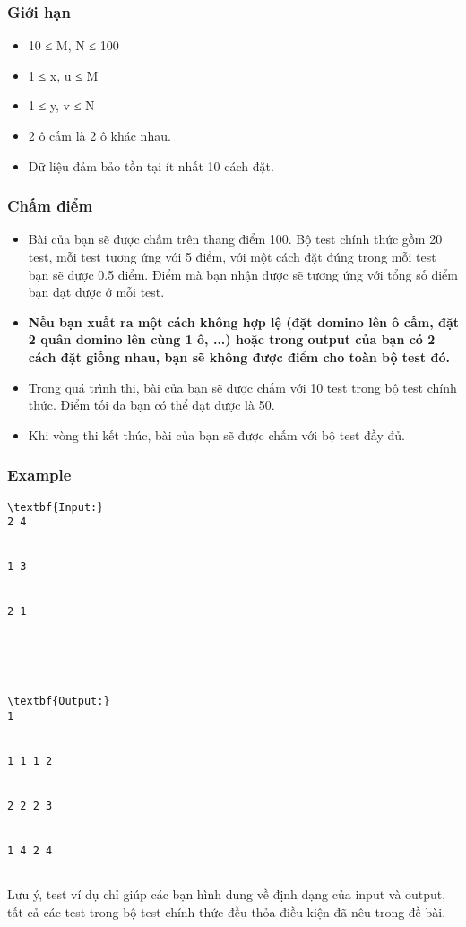 \subsubsection{   Giới hạn  }
\begin{itemize}
	\item     10 ≤ M, N ≤ 100   
	\item     1 ≤ x, u ≤ M   
	\item     1 ≤ y, v ≤ N   
	\item     2 ô cấm là 2 ô khác nhau.   
	\item     Dữ liệu đảm bảo tồn tại ít nhất 10 cách đặt.   
\end{itemize}

\subsubsection{   Chấm điểm  }
\begin{itemize}
	\item     Bài của bạn sẽ được chấm trên thang điểm 100. Bộ test chính thức gồm 20 test, mỗi test tương ứng với 5 điểm, với một cách đặt đúng trong mỗi test bạn sẽ được 0.5 điểm. Điểm mà bạn nhận được sẽ tương ứng với tổng số điểm bạn đạt được ở mỗi test.   
	\item \textbf{     Nếu bạn xuất ra một cách không hợp lệ (đặt domino lên ô cấm, đặt 2  quân domino lên cùng 1 ô, ...) hoặc trong output của bạn có 2 cách đặt  giống nhau, bạn sẽ không được điểm cho toàn bộ test đó.    }
	\item     Trong quá trình thi, bài của bạn sẽ được chấm với 10 test trong bộ test chính thức. Điểm tối đa bạn có thể đạt được là 50.   
	\item     Khi vòng thi kết thúc, bài của bạn sẽ được chấm với bộ test đầy đủ.   
\end{itemize}
\begin{itemize}
\end{itemize}
\begin{itemize}
\end{itemize}

\subsubsection{   Example  }
\begin{verbatim}
\textbf{Input:}
2 4


1 3


2 1





\textbf{Output:}
1


1 1 1 2


2 2 2 3


1 4 2 4


\end{verbatim}

   Lưu ý, test ví dụ chỉ giúp các bạn hình dung về định dạng của input và output, tất cả các test trong bộ test chính thức đều thỏa điều kiện đã nêu trong đề bài.  
